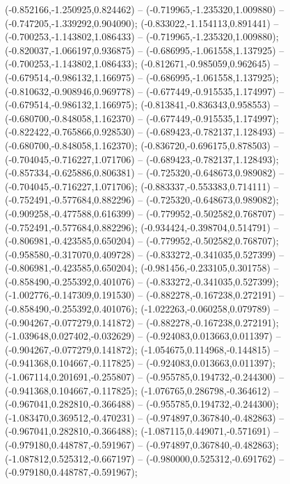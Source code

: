  (-0.852166,-1.250925,0.824462) -- (-0.719965,-1.235320,1.009880) -- (-0.747205,-1.339292,0.904090);
 (-0.833022,-1.154113,0.891441) -- (-0.700253,-1.143802,1.086433) -- (-0.719965,-1.235320,1.009880);
 (-0.820037,-1.066197,0.936875) -- (-0.686995,-1.061558,1.137925) -- (-0.700253,-1.143802,1.086433);
 (-0.812671,-0.985059,0.962645) -- (-0.679514,-0.986132,1.166975) -- (-0.686995,-1.061558,1.137925);
 (-0.810632,-0.908946,0.969778) -- (-0.677449,-0.915535,1.174997) -- (-0.679514,-0.986132,1.166975);
 (-0.813841,-0.836343,0.958553) -- (-0.680700,-0.848058,1.162370) -- (-0.677449,-0.915535,1.174997);
 (-0.822422,-0.765866,0.928530) -- (-0.689423,-0.782137,1.128493) -- (-0.680700,-0.848058,1.162370);
 (-0.836720,-0.696175,0.878503) -- (-0.704045,-0.716227,1.071706) -- (-0.689423,-0.782137,1.128493);
 (-0.857334,-0.625886,0.806381) -- (-0.725320,-0.648673,0.989082) -- (-0.704045,-0.716227,1.071706);
 (-0.883337,-0.553383,0.714111) -- (-0.752491,-0.577684,0.882296) -- (-0.725320,-0.648673,0.989082);
 (-0.909258,-0.477588,0.616399) -- (-0.779952,-0.502582,0.768707) -- (-0.752491,-0.577684,0.882296);
 (-0.934424,-0.398704,0.514791) -- (-0.806981,-0.423585,0.650204) -- (-0.779952,-0.502582,0.768707);
 (-0.958580,-0.317070,0.409728) -- (-0.833272,-0.341035,0.527399) -- (-0.806981,-0.423585,0.650204);
 (-0.981456,-0.233105,0.301758) -- (-0.858490,-0.255392,0.401076) -- (-0.833272,-0.341035,0.527399);
 (-1.002776,-0.147309,0.191530) -- (-0.882278,-0.167238,0.272191) -- (-0.858490,-0.255392,0.401076);
 (-1.022263,-0.060258,0.079789) -- (-0.904267,-0.077279,0.141872) -- (-0.882278,-0.167238,0.272191);
 (-1.039648,0.027402,-0.032629) -- (-0.924083,0.013663,0.011397) -- (-0.904267,-0.077279,0.141872);
 (-1.054675,0.114968,-0.144815) -- (-0.941368,0.104667,-0.117825) -- (-0.924083,0.013663,0.011397);
 (-1.067114,0.201691,-0.255807) -- (-0.955785,0.194732,-0.244300) -- (-0.941368,0.104667,-0.117825);
 (-1.076765,0.286798,-0.364612) -- (-0.967041,0.282810,-0.366488) -- (-0.955785,0.194732,-0.244300);
 (-1.083470,0.369512,-0.470231) -- (-0.974897,0.367840,-0.482863) -- (-0.967041,0.282810,-0.366488);
 (-1.087115,0.449071,-0.571691) -- (-0.979180,0.448787,-0.591967) -- (-0.974897,0.367840,-0.482863);
 (-1.087812,0.525312,-0.667197) -- (-0.980000,0.525312,-0.691762) -- (-0.979180,0.448787,-0.591967);
